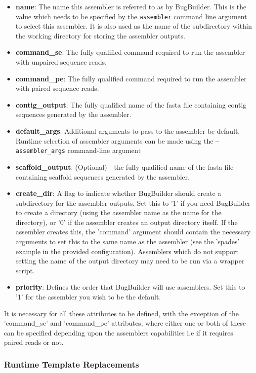 \documentclass[a4paper,10pt]{article}
\begin{document}
\begin{itemize}
\item {\bf name}: The name this assembler is referred to as by BugBuilder. This is the value which
needs to be specified by the {\tt assembler} command line argument to select this assembler. It is
also used as the name of the subdirectory within the working directory for storing the assembler
outputs.
\item {\bf command\_se}: The fully qualified command required to run the assembler with unpaired sequence reads. 
\item {\bf command\_pe}: The fully qualified command required to run the assembler with paired sequence reads. 
\item {\bf contig\_output}: The fully qualified name of the fasta file containing contig sequences
generated by the assembler.
\item {\bf default\_args}: Additional arguments to pass to the assembler be default. Runtime
selection of assembler arguments can be made using the {\tt --assembler\_args} command-line argument
\item {\bf scaffold\_output}: (Optional) - the fully qualified name of the fasta file containing
scaffold sequences generated by the assembler.
\item {\bf create\_dir}: A flag to indicate whether BugBuilder should create a subdirectory for the
assembler outputs. Set this to '1' if you need BugBuilder to create a directory (using the
assembler name as the name for the directory), or '0' if the assembler creates an output
directory itself. If the assembler creates this, the 'command' argument should contain the
necessary arguments to set this to the same name  as the assembler (see the 'spades' example in the
provided configuration). Assemblers which do not support setting the name of the output directory
may need to be run via a wrapper script.
\item {\bf priority}: Defines the order that BugBuilder will use assemblers. Set this to '1' for
the assembler you wish to be the default.
\end{itemize}

It is necessary for all these attributes to be defined, with the exception of the 'command\_se' and 'command\_pe' attributes, where either one or both of these can be specified depending upon the assemblers capabilities i.e if it requires paired reads or not.

\subsubsection{Runtime Template Replacements}
\end{document}
